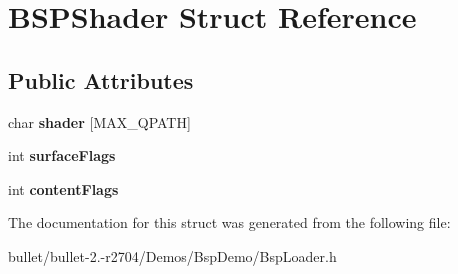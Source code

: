 \hypertarget{struct_b_s_p_shader}{\section{B\+S\+P\+Shader Struct Reference}
\label{struct_b_s_p_shader}
}
\subsection*{Public Attributes}
\begin{DoxyCompactItemize}
\item 
\hypertarget{struct_b_s_p_shader_a7e3687a4d6d6414c527e86050ef56fb5}{char {\bfseries shader} \mbox{[}M\+A\+X\+\_\+\+Q\+P\+A\+T\+H\mbox{]}}\label{struct_b_s_p_shader_a7e3687a4d6d6414c527e86050ef56fb5}

\item 
\hypertarget{struct_b_s_p_shader_a666d51c4de0c471348e966e65d7c3c72}{int {\bfseries surface\+Flags}}\label{struct_b_s_p_shader_a666d51c4de0c471348e966e65d7c3c72}

\item 
\hypertarget{struct_b_s_p_shader_a3fd3a0f3530128477c9c0002a072bf71}{int {\bfseries content\+Flags}}\label{struct_b_s_p_shader_a3fd3a0f3530128477c9c0002a072bf71}

\end{DoxyCompactItemize}


The documentation for this struct was generated from the following file\+:\begin{DoxyCompactItemize}
\item 
bullet/bullet-\/2.-\/r2704/\+Demos/\+Bsp\+Demo/Bsp\+Loader.\+h\end{DoxyCompactItemize}
